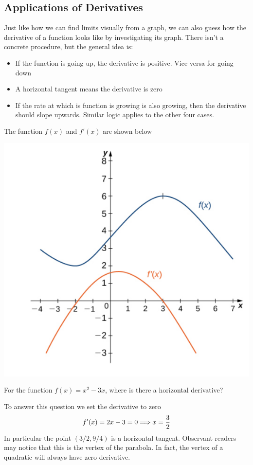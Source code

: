 \newpage 
\subsection{Applications of Derivatives}
Just like how we can find limits visually from a graph, we can also guess how the derivative of a function looks like by investigating its graph. There isn't a concrete procedure, but the general idea is:
\begin{itemize}
	\item If the function is going up, the derivative is positive. Vice versa for going down
	\item A horizontal tangent means the derivative is zero
	\item If the rate at which is function is growing is also growing, then the derivative should slope upwards. Similar logic applies to the other four cases.
\end{itemize}

\begin{example}
	The function $f(x)$ and $f'(x)$ are shown below
	\begin{center}
		\includegraphics[scale=0.75]{images/Figure 3.2.1.png} 
	\end{center}
\end{example}

\begin{example}
	For the function $f(x) = x^2 - 3x$, where is there a horizontal derivative?
	
	To answer this question we set the derivative to zero
	\[ f'(x) = 2x - 3 = 0 \Longrightarrow x = \frac{3}{2} \]
	In particular the point $(3/2, 9/4)$ is a horizontal tangent. Observant readers may notice that this is the vertex of the parabola. In fact, the vertex of a quadratic will always have zero derivative.
\end{example}

